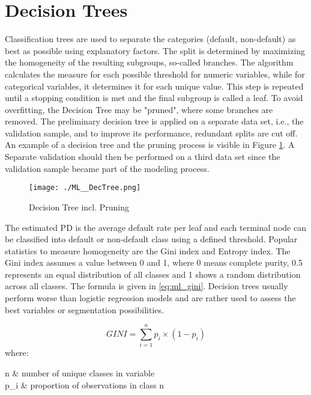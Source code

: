 \section{Decision Trees}
\label{sec:dectrees}
Classification trees are used to separate the categories (default, non-default) as best as possible using explanatory factors. The split is determined by maximizing the homogeneity of the resulting subgroups, so-called branches. The algorithm calculates the measure for each possible threshold for numeric variables, while for categorical variables, it determines it for each unique value. This step is repeated until a stopping condition is met and the final subgroup is called a leaf. To avoid overfitting, the Decision Tree may be "pruned", where some branches are removed. The preliminary decision tree is applied on a separate data set, i.e., the validation sample, and to improve its performance, redundant splits are cut off. An example of a decision tree and the pruning process is visible in Figure \ref{fig:ml_dectree}. A Separate validation should then be performed on a third data set since the validation sample became part of the modeling process. 

\begin{figure}[H]
	\centering
	\texttt{[image: ./ML\_\_DecTree.png]}
    \caption{Decision Tree incl. Pruning}
    \label{fig:ml_dectree}
\end{figure}

The estimated PD is the average default rate per leaf and each terminal node can be classified into default or non-default class using a defined threshold. Popular statistics to measure homogeneity are the Gini index and Entropy index. The Gini index assumes a value between 0 and 1, where 0 means complete purity, 0.5 represents an equal distribution of all classes and 1 shows a random distribution across all classes. The formula is given in \ref{eq:ml_gini}. Decision trees usually perform worse than logistic regression models and are rather used to assess the best variables or segmentation possibilities. \cite[pp.~75-76]{Witzany:2017}

\begin{equation}
GINI = \sum_{i=1}^{n}  p_i \times (1 - p_i) \label{eq:ml_gini}
\end{equation}
where:
\begin{conditions}
 n  	& number of unique classes in variable \\
 p_{i}  & proportion of observations in class n
\end{conditions}

